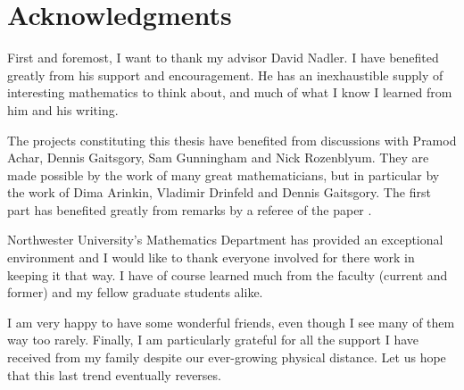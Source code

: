 \chapter*{Acknowledgments}

First and foremost, I want to thank my advisor David Nadler.
I have benefited greatly from his support and encouragement.
He has an inexhaustible supply of interesting mathematics to think about, and much of what I know I learned from him and his writing.

The projects constituting this thesis have benefited from discussions with Pramod Achar, Dennis Gaitsgory, Sam Gunningham and Nick Rozenblyum.
They are made possible by the work of many great mathematicians, but in particular by the work of Dima Arinkin, Vladimir Drinfeld and Dennis Gaitsgory.
The first part has benefited greatly from remarks by a referee of the paper \cite{Koppensteiner:pre:ExactFunctorsOnPerverseCoherentSheaves}.

Northwester University's Mathematics Department has provided an exceptional environment and I would like to thank everyone involved for there work in keeping it that way. 
I have of course learned much from the faculty (current and former) and my fellow graduate students alike.

I am very happy to have some wonderful friends, even though I see many of them way too rarely.
Finally, I am particularly grateful for all the support I have received from my family despite our ever-growing physical distance.
Let us hope that this last trend eventually reverses.
